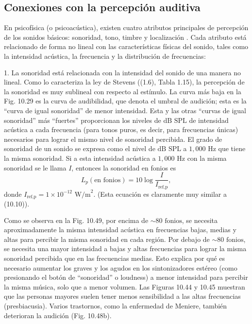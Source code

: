 \documentclass[12pt]{book}
\begin{document}

\FloatBarrier

\FloatBarrier

\subsection{Conexiones con la percepción auditiva}

En psicofísica (o psicoacústica), existen cuatro atributos principales de percepción de los sonidos básicos: sonoridad, tono, timbre y localización \cite{29, 76}. Cada atributo está relacionado de forma no lineal con las características físicas del sonido, tales como la intensidad acústica, la frecuencia y la distribución de frecuencias:

1. La sonoridad está relacionada con la intensidad del sonido de una manera no lineal. Como lo caracteriza la ley de Stevens ((1.6), Tabla 1.15), la percepción de la sonoridad es muy sublineal con respecto al estímulo. La curva más baja en la Fig. 10.29 es la curva de audibilidad, que denota el umbral de audición; esta es la ``curva de igual sonoridad'' de menor intensidad. Esta y las otras ``curvas de igual sonoridad'' más ``fuertes'' proporcionan los niveles de $\text{dB SPL}$ de intensidad acústica a cada frecuencia (para tonos puros, es decir, para frecuencias únicas) necesarios para lograr el mismo nivel de sonoridad percibida. El grado de sonoridad de un sonido se expresa como el nivel de $\text{dB SPL}$ a $1,000\text{ Hz}$ que tiene la misma sonoridad. Si a esta intensidad acústica a $1,000\text{ Hz}$ con la misma sonoridad se le llama $I$, entonces la sonoridad en fonios es
\begin{equation}
L_p(\text{en fonios}) = 10 \log \frac{I}{I_{\text{ref,p}}},
\label{eq:10.64}
\end{equation}
donde $I_{\text{ref,p}} = 1 \times 10^{-12}\text{ W/m}^2$. (Esta ecuación es claramente muy similar a (10.10)).

Como se observa en la Fig. 10.49, por encima de $\sim 80\text{ fonios}$, se necesita aproximadamente la misma intensidad acústica en frecuencias bajas, medias y altas para percibir la misma sonoridad en cada región. Por debajo de $\sim 80\text{ fonios}$, se necesita una mayor intensidad a bajas y altas frecuencias para lograr la misma sonoridad percibida que en las frecuencias medias. Esto explica por qué es necesario aumentar los graves y los agudos en los sintonizadores estéreo (como presionando el botón de ``sonoridad'' o loudness) a menor intensidad para percibir la misma música, solo que a menor volumen. Las Figuras 10.44 y 10.45 muestran que las personas mayores suelen tener menos sensibilidad a las altas frecuencias (presbiacusia). Varios trastornos, como la enfermedad de Meniere, también deterioran la audición (Fig. 10.48b).
\end{document}
